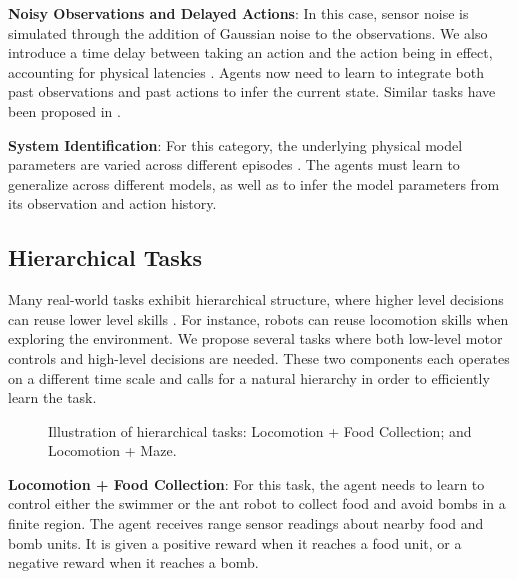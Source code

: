 \documentclass{article}
\begin{document}
{\bf Noisy Observations and Delayed Actions}: In this case, sensor noise is simulated through the addition of Gaussian noise to the observations. We also introduce a time delay between taking an action and the action being in effect, accounting for physical latencies \cite{hester2013open}. Agents now need to learn to integrate both past observations and past actions to infer the current state. Similar tasks have been proposed in \citet{bakker2001reinforcement}.

{\bf System Identification}: For this category, the underlying physical model parameters are varied across different episodes \cite{szita2003varepsilon}. The agents must learn to generalize across different models, as well as to infer the model parameters from its observation and action history. 

\subsection{Hierarchical Tasks}
\label{subsection:hierarchical_tasks}

Many real-world tasks exhibit hierarchical structure, where higher level decisions can reuse lower level skills \cite{parr1998reinforcement, sutton1999between, Dietterich:2000}. For instance, robots can reuse locomotion skills when exploring the environment. We propose several tasks where both low-level motor controls and high-level decisions are needed. These two components each operates on a different time scale and calls for a natural hierarchy in order to efficiently learn the task.




\begin{figure}[!h]
\centering
{}
\caption{Illustration of hierarchical tasks:  Locomotion + Food Collection; and  Locomotion + Maze.}\label{fig:plots_hierarchical_tasks}
\end{figure}





{\bf Locomotion + Food Collection}: For this task, the agent needs to learn to control either the swimmer or the ant robot to collect food and avoid bombs in a finite region. The agent receives range sensor readings about nearby food and bomb units. It is given a positive reward when it reaches a food unit, or a negative reward when it reaches a bomb.
\end{document}
